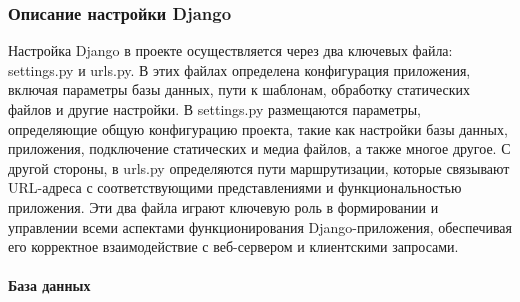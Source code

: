 \subsubsection{Описание настройки Django}

Настройка Django в проекте осуществляется через два ключевых файла: settings.py и urls.py. В этих файлах определена конфигурация приложения, включая параметры базы данных, пути к шаблонам, обработку статических файлов и другие настройки. В settings.py размещаются параметры, определяющие общую конфигурацию проекта, такие как настройки базы данных, приложения, подключение статических и медиа файлов, а также многое другое. С другой стороны, в urls.py определяются пути маршрутизации, которые связывают URL-адреса с соответствующими представлениями и функциональностью приложения. Эти два файла играют ключевую роль в формировании и управлении всеми аспектами функционирования Django-приложения, обеспечивая его корректное взаимодействие с веб-сервером и клиентскими запросами.
 
\paragraph{База данных}

